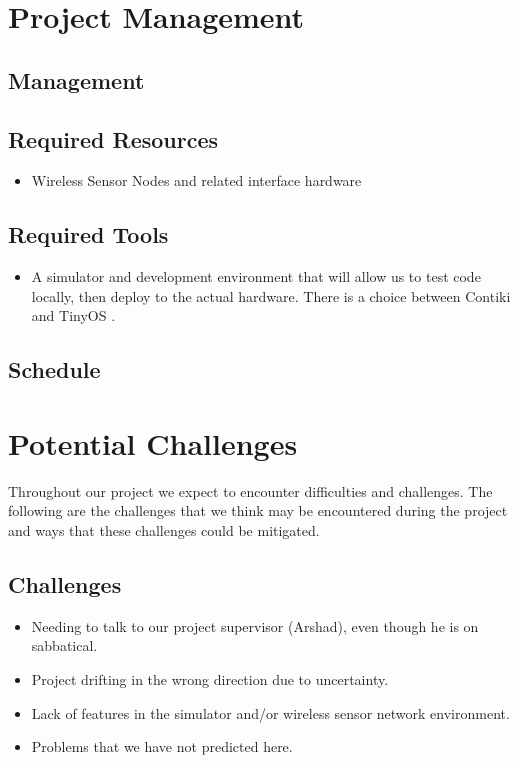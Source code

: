 \documentclass[a4paper]{article}
\begin{document}
\clearpage

\section{Project Management}

\subsection{Management}

\subsection{Required Resources}
\begin{itemize}
	\item Wireless Sensor Nodes and related interface hardware
\end{itemize}

\subsection{Required Tools}
\begin{itemize}
	\item A simulator and development environment that will allow us to test code locally, then deploy to the actual hardware. There is a choice between Contiki \cite{?} and TinyOS \cite{?}.
\end{itemize}

\subsection{Schedule}

\clearpage

\section{Potential Challenges}

Throughout our project we expect to encounter difficulties and challenges. The following are the challenges that we think may be encountered during the project and ways that these challenges could be mitigated.


\subsection{Challenges}
\begin{itemize}
	\item Needing to talk to our project supervisor (Arshad), even though he is on sabbatical.
	\item Project drifting in the wrong direction due to uncertainty.
	\item Lack of features in the simulator and/or wireless sensor network environment.
	\item Problems that we have not predicted here.
\end{itemize}
\end{document}
